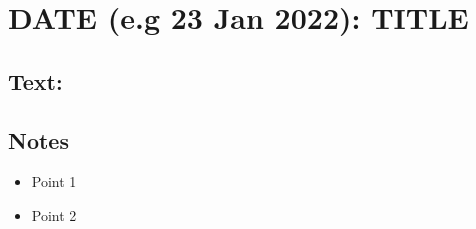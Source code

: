 \section{DATE (e.g 23 Jan 2022): TITLE}
\subsection*{Text: }
\subsection*{Notes}
\begin{itemize}
  \item{Point 1}
  \item{Point 2}
\end{itemize}